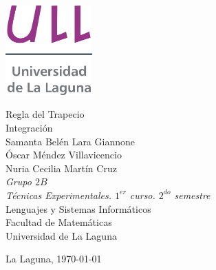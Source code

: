 \documentclass[spanish,a4paper,11pt,twoside]{report}
\begin{document}
\pagestyle{empty}
\thispagestyle{empty}

\begin{center}
\includegraphics[width=0.25\textwidth]{images/logotipo-secundario-ULL}
\end{center}


\begin{center}
        {\Huge Regla del Trapecio} \\[4.0mm] 
        {\Huge Integración} \\[3.0mm]
        {\Large Samanta Belén Lara Giannone\\
                Óscar Méndez Villavicencio\\
                Nuria Cecilia Martín Cruz} \\[5mm]
        {\Large \textit{Grupo $2B$}} \\[5mm]


        {\em Técnicas Experimentales. $1^{er}$ curso. $2^{do}$ semestre} \\[10mm]
        Lenguajes y Sistemas Informáticos \\[5mm]
        Facultad de Matemáticas \\[5mm]
        
        Universidad de La Laguna \\
\end{center}

\begin{center}
  La Laguna, \today 
\end{center}

\newpage{\pagestyle{empty}\cleardoublepage}

\pagestyle{myheadings} 


\renewcommand{\thepage}{\roman{page}}
\setcounter{page}{1}
\end{document}
